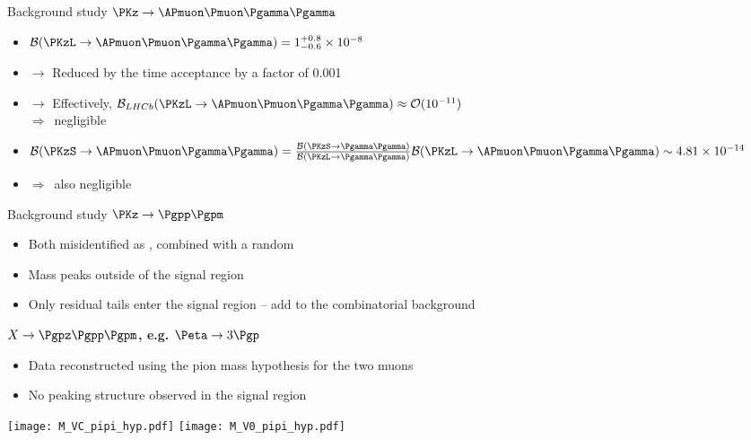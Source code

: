 \documentclass[9pt,hyperref={unicode},utf8]{beamer}
\def\follows{$\Rightarrow$~}
\begin{document}
\begin{frame}{Background study}
 \textbf{$\PKz\to\APmuon\Pmuon\Pgamma\Pgamma$}
 \vspace{0.2cm}
 \begin{itemize}
  \setlength\itemsep{0.7em}
  \item ${\cal B}(\PKzL\to\APmuon\Pmuon\Pgamma\Pgamma) = 1^{+0.8}_{-0.6}\times 10^{-8}$
  \item[] $\rightarrow$ Reduced by the time acceptance by a factor of 0.001
  \item[] $\rightarrow$ Effectively, ${\cal B}_{LHCb}(\PKzL\to\APmuon\Pmuon\Pgamma\Pgamma) \approx {\cal O}(10^{-11})$ \\ \follows negligible
  \item ${\cal B}(\PKzS\to\APmuon\Pmuon\Pgamma\Pgamma)  =   \frac{{\cal B}(\PKzS\to\Pgamma\Pgamma)}{{\cal B}(\PKzL\to\Pgamma\Pgamma)} {\cal B}(\PKzL\to\APmuon\Pmuon\Pgamma\Pgamma)\sim 4.81\times10^{-14}$
  \item[] \follows also negligible
 \end{itemize}
\end{frame}

\begin{frame}{Background study}
 \textbf{$\PKz\to\Pgpp\Pgpm$}
 \vspace{0.2cm}
 \begin{itemize}
  \item Both \Pgp misidentified as \Pmu, combined with a random \Pgpz
  \item Mass peaks outside of the signal region
  \item Only residual tails enter the signal region -- add to the combinatorial background
 \end{itemize}
 
 \vspace{0.3cm}
 
 \textbf{$X\to\Pgpz\Pgpp\Pgpm$, e.g. $\Peta\to3\Pgp$}
 \vspace{0.2cm}
 \begin{itemize}
  \item Data reconstructed using the pion mass hypothesis for the two muons
  \item No peaking structure observed in the signal region
 \end{itemize}
 
 \vspace{0.3cm}
 
  \centering
  \texttt{[image: M\_VC\_pipi\_hyp.pdf]}\hspace{0.4cm}
  \texttt{[image: M\_V0\_pipi\_hyp.pdf]}
\end{frame}
\end{document}
